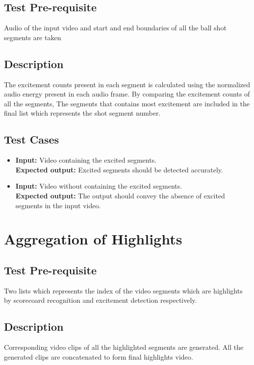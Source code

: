\subsection{Test Pre-requisite}
Audio of the input video and start and end boundaries of all the ball shot segments are taken
\subsection{Description}
The excitement counts present in each segment is calculated using the normalized audio energy present in each audio frame. By comparing the excitement counts of all the segments, The segments that contains most excitement are included in the final list which represents the shot segment number.
\subsection{Test Cases}
\begin{itemize}
\item \textbf{Input:} Video containing the excited segments.\\
\indent\textbf{Expected output:} Excited segments should be detected accurately.
\item \textbf{Input:} Video without containing the excited segments.\\
\indent\textbf{Expected output:} The output should convey the absence of excited segments in the input video.
\end{itemize}
\section{Aggregation of Highlights}
\subsection{Test Pre-requisite}
Two lists which represents the index of the video segments which are highlights by scorecoard recognition and excitement detection respectively.
\subsection{Description}
Corresponding video clips of all the highlighted segments are generated. All the generated clips are concatenated to form final highlights video.
